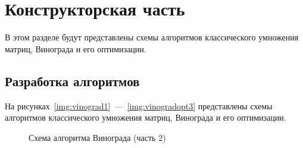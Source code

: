 \chapter{Конструкторская часть}

В этом разделе будут представлены схемы алгоритмов классического умножения матриц, Винограда и его оптимизации.

\section{Разработка алгоритмов}

На рисунках~\ref{img:vinograd1}~---~\ref{img:vinogradopt3} представлены схемы алгоритмов классического умножения матриц, Винограда и его оптимизации.



\begin{figure}[H]
	\caption{Схема алгоритма Винограда (часть 2)}
	\label{img:vinograd2}
\end{figure}

